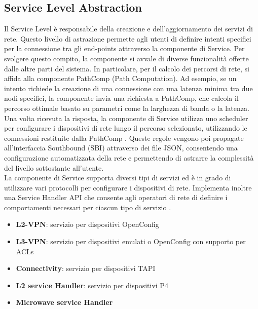 \subsection{Service Level Abstraction}
Il Service Level è responsabile della creazione e dell'aggiornamento dei servizi di rete.
Questo livello di astrazione permette agli utenti di definire intenti specifici per la connessione tra gli end-points attraverso la componente di Service.
Per svolgere questo compito, la componente si avvale di diverse funzionalità offerte dalle altre parti del sistema.
In particolare, per il calcolo dei percorsi di rete, si affida alla componente PathComp (Path Computation).
Ad esempio, se un intento richiede la creazione di una connessione con una latenza minima tra due nodi specifici, 
la componente invia una richiesta a PathComp, che calcola il percorso ottimale basato su parametri come la larghezza di banda o la latenza.
Una volta ricevuta la risposta, la componente di Service utilizza uno scheduler per configurare i dispositivi di rete lungo il percorso selezionato, utilizzando le connessioni restituite dalla PathComp \cite{D32}.
Queste regole vengono poi propagate all'interfaccia Southbound (SBI) attraverso dei file JSON, consentendo una configurazione automatizzata della rete e permettendo di astrarre la complessità del livello sottostante all'utente.
\\La componente di Service supporta diversi tipi di servizi ed è in grado di utilizzare vari protocolli per configurare i dispositivi di rete.
Implementa inoltre una Service Handler API che consente agli operatori di rete di definire i comportamenti necessari per ciascun tipo di servizio \cite{D32}.
\begin{itemize}
    \item \textbf{L2-VPN}: servizio per dispositivi OpenConfig
    \item \textbf{L3-VPN}: servizio per dispositivi emulati o OpenConfig con supporto per ACLs
    \item \textbf{Connectivity}: servizio per dispositivi TAPI
    \item \textbf{L2 service Handler}: servizio per dispositivi P4
    \item \textbf{Microwave service Handler}
\end{itemize}
